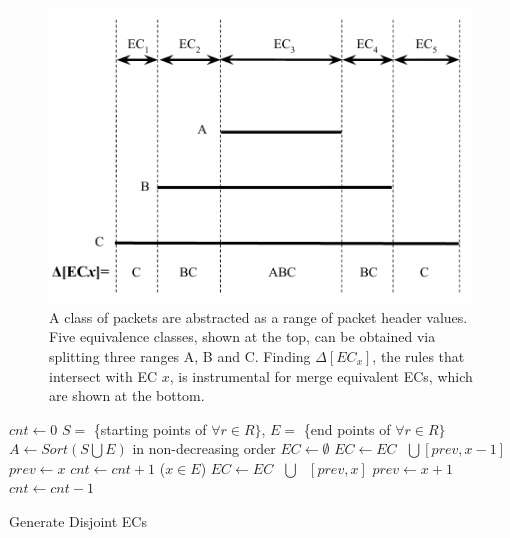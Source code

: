 \begin{figure}[t]
\centering
\includegraphics[scale=.52]{figures/DisjointECs.pdf}
\caption{A class of packets are abstracted as a range of packet header values.
        Five equivalence classes, shown at the top, can be obtained via splitting three ranges A, B and C.
        Finding $\Delta[EC_x]$, the rules that intersect with EC $x$, is instrumental for
        merge equivalent ECs, which are shown at the bottom.}
\label{Fig:DisjointECsAsInterval}
\end{figure}

\begin{algorithm}[t]
\DontPrintSemicolon
{}
$cnt \gets 0$\;
$S = $ \{starting points of $\forall r \in R\}$, $E = $ \{end points of $\forall r \in R\}$\;
$A \gets Sort(S \bigcup E)$ in non-decreasing order\;
$EC \gets \emptyset$\;
 {
         {
                 {\label{Alg:LineEndStart1} 
                        $EC \gets EC \text{ }\bigcup \text{} [prev, x-1]$\;
                }\label{Alg:LineEndStart2} 
                $prev \gets x$\;\label{Alg:LineNewPrev1}
                $cnt \gets cnt + 1$\;
        }
        \Else ($x \in E$) {
                $EC \gets EC \text{ } \bigcup \text{ } [prev, x]$\;\label{Alg:LineEndEnd}
                $prev \gets x + 1$\;\label{Alg:LineNewPrev2}
                $cnt \gets cnt - 1$\;
        }
}
\caption{Generate Disjoint ECs}
\label{Alg:GenDisjointECs}
\end{algorithm}

